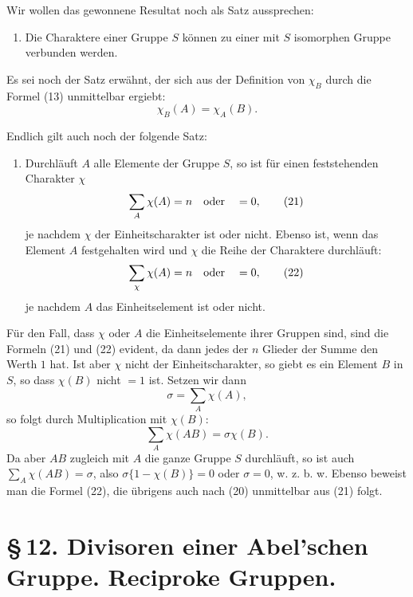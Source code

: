 \documentclass[11pt]{article}
\begin{document}
Wir wollen das gewonnene Resultat noch als Satz aussprechen:

\begin{enumerate}[resume,label=\arabic*.]
\item Die Charaktere einer Gruppe $S$ können zu einer mit $S$ isomorphen Gruppe verbunden werden.
\end{enumerate}

Es sei noch der Satz erwähnt, der sich aus der Definition von $\chi_B$ durch die Formel (13) unmittelbar ergiebt:
\begin{equation}
\chi_B(A)=\chi_A(B).
\tag{20}
\end{equation}

Endlich gilt auch noch der folgende Satz:

\begin{enumerate}[resume,label=\arabic*.]
\item Durchläuft $A$ alle Elemente der Gruppe $S$, so ist für einen feststehenden Charakter $\chi$
\begin{equation}
\sum_A\chi(A)=n\quad\hbox{oder}\quad =0,
\tag{21}
\end{equation}
je nachdem $\chi$ der Einheitscharakter ist oder nicht. Ebenso ist, wenn das Element $A$ festgehalten wird und $\chi$ die Reihe der Charaktere durchläuft:
\begin{equation}
\sum_\chi \chi(A)=n\quad\hbox{oder}\quad =0,
\tag{22}
\end{equation}
je nachdem $A$ das Einheitselement ist oder nicht.
\end{enumerate}

Für den Fall, dass $\chi$ oder $A$ die Einheitselemente ihrer Gruppen sind, sind die Formeln (21) und (22) evident, da dann jedes der $n$ Glieder der Summe den Werth $1$ hat. Ist aber $\chi$ nicht der Einheitscharakter, so giebt es ein Element $B$ in $S$, so dass $\chi(B)$ nicht $=1$ ist. Setzen wir dann
\[
\sigma=\sum_A \chi(A),
\]
so folgt durch Multiplication mit $\chi(B)$:
\[
\sum_A\chi(AB)=\sigma\chi(B).
\]
Da aber $AB$ zugleich mit $A$ die ganze Gruppe $S$ durchläuft, so ist auch $\sum_A\chi(AB)=\sigma$, also $\sigma\{1-\chi(B)\}=0$ oder $\sigma=0$, w. z. b. w. Ebenso beweist man die Formel (22), die übrigens auch nach (20) unmittelbar aus (21) folgt.

\section*{\S\,12. Divisoren einer Abel'schen Gruppe. Reciproke Gruppen.}
\end{document}
